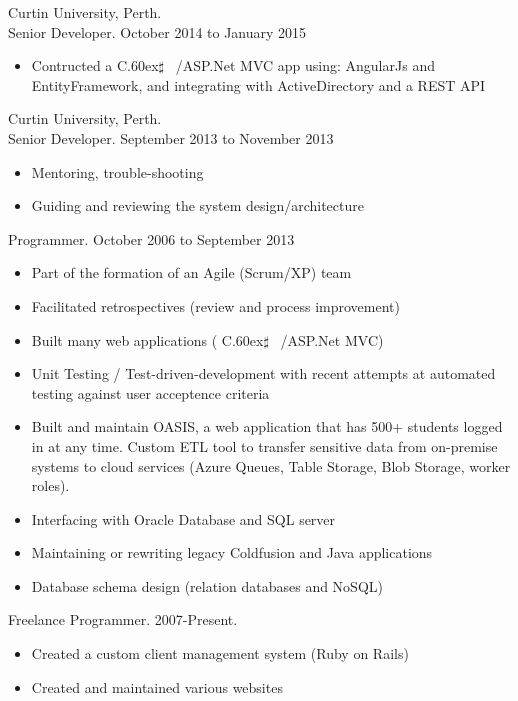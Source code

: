 \documentclass[margin]{res}
\def\Csharp{%
    C\raise.60ex\hbox{$\sharp$}%
\spacefactor1000 }
\begin{document}
\begin{resume}
  Curtin University, Perth.\\
  Senior Developer. October 2014 to January 2015
  \begin{itemize}
    \item Contructed a \Csharp\ /ASP.Net MVC app using: AngularJs and EntityFramework, and integrating with ActiveDirectory and a REST API
  \end{itemize}

  Curtin University, Perth.\\
  Senior Developer. September 2013 to November 2013
  \begin{itemize}
    \item Mentoring, trouble-shooting
    \item Guiding and reviewing the system design/architecture
  \end{itemize}
  \vspace{-0.1in}
  Programmer. October 2006 to September 2013
  \begin{itemize}
    \item Part of the formation of an Agile (Scrum/XP) team
    \item Facilitated retrospectives (review and process improvement)
    \item Built many web applications (\Csharp\ /ASP.Net MVC)
    \item Unit Testing / Test-driven-development with recent attempts at automated testing against user acceptence criteria 
    \item Built and maintain OASIS, a web application
            that has 500+ students logged in at any time. Custom ETL tool to transfer sensitive data from on-premise systems to cloud services (Azure Queues, Table Storage, Blob Storage, worker roles).
    \item Interfacing with Oracle Database and SQL server
    \item Maintaining or rewriting legacy Coldfusion and Java applications
    \item Database schema design (relation databases and NoSQL)
  \end{itemize}
  
  Freelance Programmer. 2007-Present.
  \begin{itemize}
    \item Created a custom client management system (Ruby on Rails)
    \item Created and maintained various websites
  \end{itemize} 
  

\end{resume}
\end{document}
